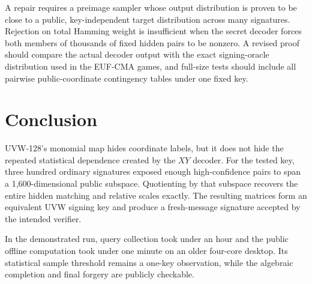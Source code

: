 \documentclass[11pt,a4paper]{article}
\begin{document}
A repair requires a preimage sampler whose output distribution is proven to
be close to a public, key-independent target distribution across many
signatures.
Rejection on total Hamming weight is insufficient when the secret decoder
forces both members of thousands of fixed hidden pairs to be nonzero.  A
revised proof should compare the actual decoder output with the exact
signing-oracle distribution used in the EUF-CMA games, and full-size tests
should include all pairwise public-coordinate contingency tables under one
fixed key.

\section{Conclusion}

UVW-128's monomial map hides coordinate labels, but it does not hide the
repeated statistical dependence created by the $XY$ decoder.  For the tested key, three hundred ordinary signatures exposed enough
high-confidence pairs to span a 1,600-dimensional public subspace.  Quotienting by that subspace recovers
the entire hidden matching and relative scales exactly.  The resulting
matrices form an equivalent UVW signing key and produce a fresh-message
signature accepted by the intended verifier.

In the demonstrated run, query collection took under an hour and the public
offline computation took under one minute on an older four-core desktop.  Its
statistical sample threshold remains a one-key observation, while the algebraic
completion and final forgery are publicly checkable.
\end{document}
